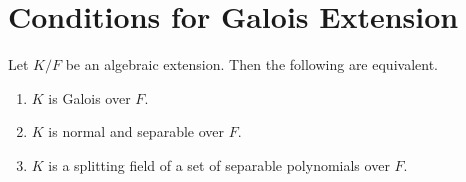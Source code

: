 \section{Conditions for Galois Extension}

\begin{theorem}\label{chap4:galois-iff-separable-and-normal}
	Let $K/F$ be an algebraic extension. Then the following are equivalent.
	\begin{enumerate}
		\item $K$ is Galois over $F$.
		
		\item $K$ is normal and separable over $F$.
		
		\item $K$ is a splitting field of a set of separable polynomials over $F$.
	\end{enumerate}
\end{theorem}


